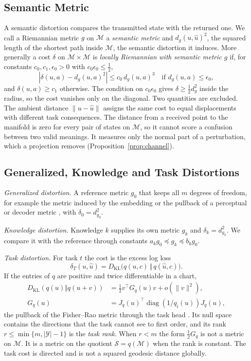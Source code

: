 \documentclass[10pt,journal]{IEEEtran}
\newcommand{\M}{\mathcal M}
\newcommand{\Sset}{\mathcal S}
\newcommand{\KL}{D_{\mathrm{KL}}}
\DeclareMathOperator{\diag}{diag}
\begin{document}
\subsection{Semantic Metric}
A semantic distortion compares the transmitted state with the returned one. We call a Riemannian metric $g$ on $\M$ a \emph{semantic metric} and $d_g(u,\hat u)^2$, the squared length of the shortest path inside $\M$, the semantic distortion it induces. More generally a cost $\delta$ on $\M\times\M$ is \emph{locally Riemannian with semantic metric $g$} if, for constants $c_0,c_1,\epsilon_0>0$ with $c_0\epsilon_0\le\frac12$,
\begin{equation}
 |\delta(u,a)-d_g(u,a)^2|\le c_0\,d_g(u,a)^3\quad\text{if }d_g(u,a)\le\epsilon_0, \label{eq:locR}
\end{equation}
and $\delta(u,a)\ge c_1$ otherwise. The condition on $c_0\epsilon_0$ gives $\delta\ge\frac12d_g^2$ inside the radius, so the cost vanishes only on the diagonal. Two quantities are excluded. The ambient distance $\|u-\hat u\|$ assigns the same cost to equal displacements with different task consequences. The distance from a received point to the manifold is zero for every pair of states on $\M$, so it cannot score a confusion between two valid meanings. It measures only the normal part of a perturbation, which a projection removes (Proposition~\ref{prop:channel}).

\subsection{Generalized, Knowledge and Task Distortions}
\emph{Generalized distortion.} A reference metric $g_0$ that keeps all $m$ degrees of freedom, for example the metric induced by the embedding or the pullback of a perceptual or decoder metric \cite{arvanitidis2021latentspaceodditycurvature}, with $\delta_0=d_{g_0}^2$.

\emph{Knowledge distortion.} Knowledge $k$ supplies its own metric $g_k$ and $\delta_k=d_{g_k}^2$. We compare it with the reference through constants $a_kg_0\preceq g_k\preceq b_kg_0$.

\emph{Task distortion.} For task $t$ the cost is the excess log loss
\begin{equation}
 \delta_T(u,\hat u)=\KL\big(q(u,c)\,\Vert\,q(\hat u,c)\big).
\end{equation}
If the entries of $q$ are positive and twice differentiable in a chart,
\begin{align}
 \KL(q(u)\Vert q(u+v))&=\tfrac12 v^\top G_q(u)v+o(\|v\|^2),\label{eq:fisher}\\
 G_q(u)&=J_q(u)^\top\diag(1/q_i(u))J_q(u),\nonumber
\end{align}
the pullback of the Fisher--Rao metric through the task head \cite{arvanitidis2022pullinginformationgeometry,amari2000methods}. Its null space contains the directions that the task cannot see to first order, and its rank $r\le\min\{m,|\mathcal Y|-1\}$ is the \emph{task rank}. When $r<m$ the form $\frac12G_q$ is not a metric on $\M$. It is a metric on the quotient $\Sset=q(\M)$ when the rank is constant. The task cost is directed and is not a squared geodesic distance globally.
\end{document}
